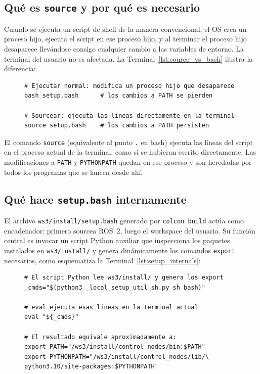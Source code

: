\subsection{Qué es \texttt{source} y por qué es necesario}

Cuando se ejecuta un script de shell de la manera convencional, el OS crea un proceso hijo, ejecuta el script en ese proceso hijo, y al terminar el proceso hijo desaparece llevándose consigo cualquier cambio a las variables de entorno. La terminal del usuario no es afectada. La Terminal~\ref{lst:source_vs_bash} ilustra la diferencia:

\begin{figure}[H]
\centering
\begin{lstlisting}[style=bash, caption={Diferencia entre ejecutar y sourcear un script.}, label={lst:source_vs_bash}]
# Ejecutar normal: modifica un proceso hijo que desaparece
bash setup.bash      # los cambios a PATH se pierden

# Sourcear: ejecuta las lineas directamente en la terminal
source setup.bash    # los cambios a PATH persisten
\end{lstlisting}
\end{figure}

El comando \texttt{source} (equivalente al punto \texttt{.} en bash) ejecuta las líneas del script en el proceso actual de la terminal, como si se hubieran escrito directamente. Las modificaciones a \texttt{PATH} y \texttt{PYTHONPATH} quedan en ese proceso y son heredadas por todos los programas que se lancen desde ahí.

\subsection{Qué hace \texttt{setup.bash} internamente}

El archivo \texttt{ws3/install/setup.bash} generado por \texttt{colcon build} actúa como encadenador: primero sourcea ROS~2, luego el workspace del usuario. Su función central es invocar un script Python auxiliar que inspecciona los paquetes instalados en \texttt{ws3/install/} y genera dinámicamente los comandos \texttt{export} necesarios, como esquematiza la Terminal~\ref{lst:setup_internals}:

\begin{figure}[H]
\centering
\begin{lstlisting}[style=bash, caption={Mecanismo central de \texttt{local\_setup.bash} (simplificado).}, label={lst:setup_internals}]
# El script Python lee ws3/install/ y genera los export
_cmds="$(python3 _local_setup_util_sh.py sh bash)"

# eval ejecuta esas lineas en la terminal actual
eval "${_cmds}"

# El resultado equivale aproximadamente a:
export PATH="/ws3/install/control_nodes/bin:$PATH"
export PYTHONPATH="/ws3/install/control_nodes/lib/\
python3.10/site-packages:$PYTHONPATH"
\end{lstlisting}
\end{figure}

